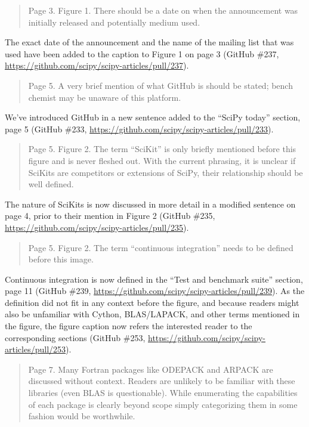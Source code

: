 \documentclass[10pt,stdletter,dateno]{newlfm}
\begin{document}
\begin{newlfm}
\begin{quote}
Page 3. Figure 1. There should be a date on when the announcement was initially released and potentially medium used.
\end{quote}

The exact date of the announcement and the name of the mailing list that was used have been added to the caption to Figure 1 on page 3 (GitHub \#237, \url{https://github.com/scipy/scipy-articles/pull/237}). 

\begin{quote}
Page 5. A very brief mention of what GitHub is should be stated; bench chemist may be unaware of this platform.
\end{quote}

We've introduced GitHub in a new sentence added to the ``SciPy today'' section, page 5 (GitHub \#233, \url{https://github.com/scipy/scipy-articles/pull/233}). 

\begin{quote}
Page 5. Figure 2. The term ``SciKit'' is only briefly mentioned before this figure and is never fleshed out. With the current phrasing, it is unclear if SciKits are competitors or extensions of SciPy, their relationship should be well defined.
\end{quote}

The nature of SciKits is now discussed in more detail in a modified sentence on page 4, prior to their mention in Figure 2 (GitHub \#235, \url{https://github.com/scipy/scipy-articles/pull/235}). 

\begin{quote}
Page 5. Figure 2. The term ``continuous integration'' needs to be defined before this image.
\end{quote}

Continuous integration is now defined in the ``Test and benchmark suite'' section, page 11 (GitHub \#239, \url{https://github.com/scipy/scipy-articles/pull/239}). As the definition did not fit in any context before the figure, and because readers might also be unfamiliar with Cython, BLAS/LAPACK, and other terms mentioned in the figure, the figure caption now refers the interested reader to the corresponding sections (GitHub \#253, \url{https://github.com/scipy/scipy-articles/pull/253}).

\begin{quote}
Page 7. Many Fortran packages like ODEPACK and ARPACK are discussed without context. Readers are unlikely to be familiar with these libraries (even BLAS is questionable). While enumerating the capabilities of each package is clearly beyond scope simply categorizing them in some fashion would be worthwhile.
\end{quote}


\end{newlfm}
\end{document}
